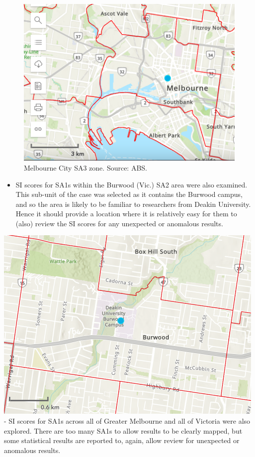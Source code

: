 \documentclass[]{tufte-book}
\providecommand{\tightlist}{%
  \setlength{\itemsep}{0pt}\setlength{\parskip}{0pt}}
\begin{document}
\begin{figure}
\centering
\includegraphics{images/Melbourne_city.png}
\caption{Melbourne City SA3 zone. Source: ABS.}
\end{figure}

\begin{itemize}
\tightlist
\item
  SI scores for SA1s within the Burwood (Vic.) SA2 area were also
  examined. This sub-unit of the case was selected as it contains the
  Burwood campus, and so the area is likely to be familiar to
  researchers from Deakin University. Hence it should provide a location
  where it is relatively easy for them to (also) review the SI scores
  for any unexpected or anomalous results.
\end{itemize}

\includegraphics{images/Burwood.png} - SI scores for SA1s across all of
Greater Melbourne and all of Victoria were also explored. There are too
many SA1s to allow results to be clearly mapped, but some statistical
results are reported to, again, allow review for unexpected or anomalous
results.
\end{document}
